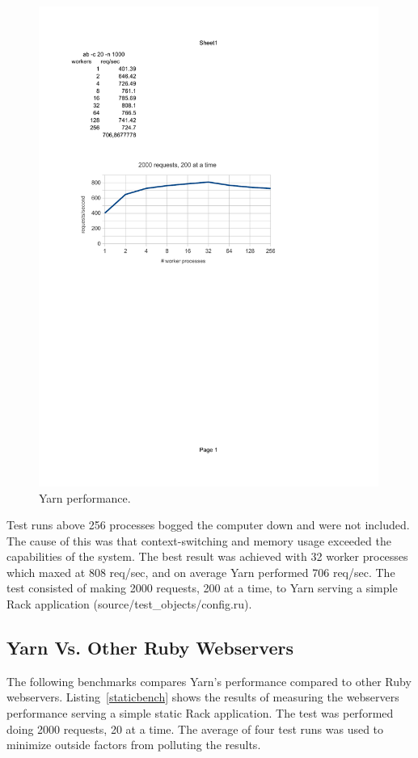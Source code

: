 \begin{figure}[htb]
  \centering
  \includegraphics[width=0.99\textwidth]{benchmark/optimal_workers_crop.pdf}
  \caption{Yarn performance.}
  \label{optwork}
\end{figure}

Test runs above 256 processes bogged the computer down and were not included.
The cause of this was that context-switching and memory usage exceeded the
capabilities of the system. The best result was achieved with 32 worker
processes which maxed at 808 req/sec, and on average Yarn performed 706 req/sec. The
test consisted of making 2000 requests, 200 at a time, to Yarn serving a
simple Rack application (source/test\_objects/config.ru).

\subsection{Yarn Vs. Other Ruby Webservers}
The following benchmarks compares Yarn's performance compared to
other Ruby webservers. Listing~\ref{staticbench} shows the results of
measuring the webservers performance serving a simple static Rack application.
The test was performed doing 2000 requests, 20 at a time. The average of four
test runs was used to minimize outside factors from polluting the results.

